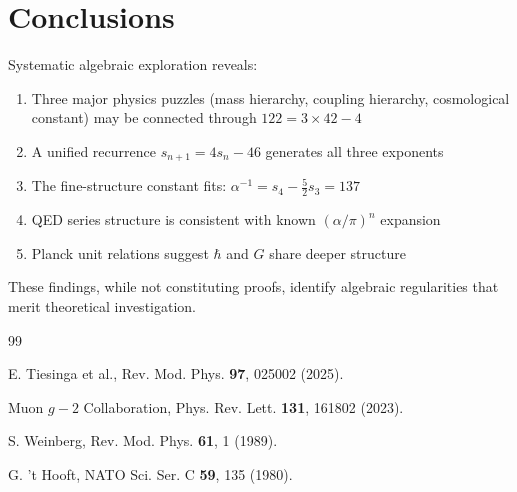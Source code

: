 \documentclass[twocolumn,prl,aps,superscriptaddress]{revtex4-2}
\begin{document}
\section{Conclusions}

Systematic algebraic exploration reveals:
\begin{enumerate}
\item Three major physics puzzles (mass hierarchy, coupling hierarchy, 
cosmological constant) may be connected through $122 = 3 \times 42 - 4$
\item A unified recurrence $s_{n+1} = 4s_n - 46$ generates all three exponents
\item The fine-structure constant fits: $\alpha^{-1} = s_4 - \frac{5}{2}s_3 = 137$
\item QED series structure is consistent with known $({\alpha}/{\pi})^n$ expansion
\item Planck unit relations suggest $\hbar$ and $G$ share deeper structure
\end{enumerate}

These findings, while not constituting proofs, identify algebraic regularities 
that merit theoretical investigation.

\begin{thebibliography}{99}

E. Tiesinga et al., Rev. Mod. Phys. \textbf{97}, 025002 (2025).

Muon $g-2$ Collaboration, Phys. Rev. Lett. \textbf{131}, 161802 (2023).

S. Weinberg, Rev. Mod. Phys. \textbf{61}, 1 (1989).

G. 't Hooft, NATO Sci. Ser. C \textbf{59}, 135 (1980).

\end{thebibliography}
\end{document}
